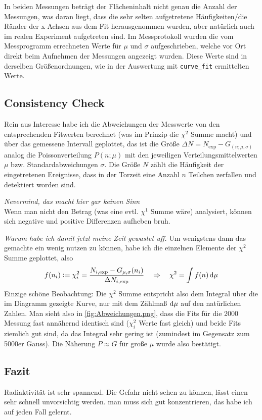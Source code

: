 In beiden Messungen beträgt der Flächeninhalt nicht genau die Anzahl der Messungen, was daran liegt, dass die sehr selten aufgetretene Häufigkeiten/die Ränder der x-Achsen aus dem Fit herausgenommen wurden, aber natürlich auch im realen Experiment aufgetreten sind. Im Messprotokoll wurden die vom Messprogramm errechneten Werte für \(\mu\) und \(\sigma\) aufgeschrieben, welche vor Ort direkt beim Aufnehmen der Messungen angezeigt wurden. Diese Werte sind in derselben Größenordnungen, wie in der Auswertung mit \verb|curve_fit| ermittelten Werte. 
\clearpage

\subsection{Consistency Check}
\FloatBarrier
Rein aus Interesse habe ich die Abweichungen der Messwerte von den entsprechenden Fitwerten berechnet (was im Prinzip die \(\chi^2\) Summe macht) und über das gemessene Intervall geplottet, das ist die Größe \(\Delta N=N_\text{exp}-G_{(n;\mu,\sigma)}\) analog die Poissonverteilung \(P(n;\mu)\) mit den jeweiligen Verteilungsmittelwerten \(\mu\) bzw. Standardabweichungen \(\sigma\). Die Größe \(N\) zählt die Häufigkeit der eingetretenen Ereignisse, dass in der Torzeit eine Anzahl \(n\) Teilchen zerfallen und detektiert worden sind. 

\emph{Nevermind, das macht hier gar keinen Sinn} \\
Wenn man nicht den Betrag (was eine evtl. \(\chi^1\) Summe wäre) analysiert, können sich negative und positive Differenzen aufheben bruh. 

\emph{Warum habe ich damit jetzt meine Zeit gewastet uff.} Um wenigstens dann das gemachte ein wenig nutzen zu können, habe ich die einzelnen Elemente der \(\chi^2\) Summe geplottet, also 
\begin{equation}
f(n_i)\vcentcolon=\chi^2_i=\frac{N_{i,\text{exp}}-G_{\mu,\sigma}(n_i)}{\Delta N_{i,\text{exp}}} \quad\Rightarrow\quad \chi^2=\int f(n) \mathop{}\!\mathrm{d}\mu
\end{equation}
Einzige schöne Beobachtung: Die \(\chi^2\) Summe entspricht also dem Integral über die im Diagramm gezeigte Kurve, nur mit dem Zählmaß \(\mathop{}\!\mathrm{d}\mu\) auf den natürlichen Zahlen. Man sieht also in \cref{fig:Abweichungen.png}, dass die Fits für die 2000 Messung fast annähernd identisch sind (\(\chi^2_i\) Werte fast gleich) und beide Fits ziemlich gut sind, da das Integral sehr gering ist (zumindest im Gegensatz zum 5000er Gauss). Die Näherung \(P\approx G\) für große \(\mu\) wurde also bestätigt.     
\FloatBarrier

\subsection{Fazit}
Radiaktivität ist sehr spannend. Die Gefahr nicht sehen zu können, lässt einen sehr schnell unvorsichtig werden. man muss sich gut konzentrieren, das habe ich auf jeden Fall gelernt.
